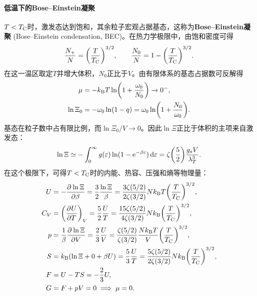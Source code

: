 \paragraph{低温下的Bose--Einstein凝聚}

$T < T_\mathrm C$时，激发态达到饱和，其余粒子宏观占据基态，这称为\textbf{Bose--Einstein凝聚} (Bose--Einstein condensation, BEC)。在热力学极限中，由饱和密度可得
\begin{equation}
	\frac{N_+}N = \biggl(\frac T{T_\mathrm C}\biggr)^{3/2},\qquad
	\frac{N_0}N = 1 - \biggl(\frac{T}{T_\mathrm C}\biggr)^{3/2}.
\end{equation}
在这一温区取定$T$并增大体积，$N_0$正比于$V$。由有限体系的基态占据数可反解得
\begin{align*}
	\mu &= -k_{\mathrm{B}} T\ln\biggl(1 + \frac{\omega_0}{N_0}\biggr) \to 0^-,\\
	\ln\Xi_0 &= -\omega_0\ln(1 - q) = \omega_0\ln\biggl(1 + \frac{N_0}{\omega_0}\biggr).
\end{align*}
基态在粒子数中占有限比例，而$\ln\Xi_0/V \to 0$。因此$\ln\Xi$正比于体积的主项来自激发态：
\begin{equation}
	\ln\Xi \simeq -\int_0^\infty g(\varepsilon)\ln(1 - \mathop{}\!\mathrm{e}^{-\beta\varepsilon})\mathop{}\!\mathrm{d}\varepsilon
	= \zeta\biggl(\frac52\biggr)\frac{g_sV}{\lambda_T^3}.
\end{equation}
在这个极限下，可得$T < T_\mathrm C$时的内能、热容、压强和熵等物理量：
\begin{subequations}
	\begin{align}
		U &= -\frac{\partial^{}\ln\Xi}{\partial{\beta}^{}} = \frac32\frac{\ln\Xi}\beta = \frac{3\zeta(5/2)}{2\zeta(3/2)}Nk_{\mathrm{B}} T\biggl(\frac T{T_\mathrm C}\biggr)^{3/2},\\
		C_V &= \biggl(\frac{\partial^{}U}{\partial{T}^{}}\biggr)_{V} = \frac52\frac UT = \frac{15\zeta(5/2)}{4\zeta(3/2)}Nk_{\mathrm{B}}\biggl(\frac T{T_\mathrm C}\biggr)^{3/2},\\
		p &= \frac1\beta\frac{\partial^{}\ln\Xi}{\partial{V}^{}} = \frac23\frac UV = \frac{\zeta(5/2)}{\zeta(3/2)}\frac{Nk_{\mathrm{B}} T}V\biggl(\frac T{T_\mathrm C}\biggr)^{3/2},\\
		S &= k_{\mathrm{B}}(\ln\Xi + 0 + \beta U) = \frac53\frac UT = \frac{5\zeta(5/2)}{2\zeta(3/2)}Nk_{\mathrm{B}}\biggl(\frac T{T_\mathrm C}\biggr)^{3/2},\\
		F &= U - TS = -\frac23U,\\
		G &= F + pV = 0 \implies \mu = 0.
	\end{align}
\end{subequations}

